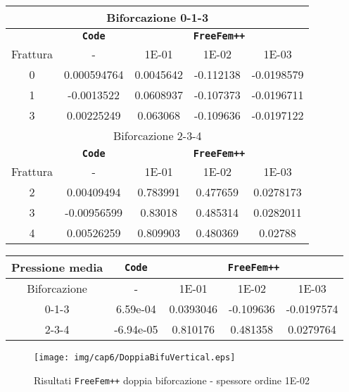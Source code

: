 \begin{center}
\begin{tabular}{|c|c|c|c|c|}
\hline
\multicolumn{5}{|c|}{Biforcazione 0-1-3}\\
\hline
 & \textbf{\texttt{Code}} & \multicolumn{3}{|c|}{\textbf{\texttt{FreeFem++}}} \\
\hline
\multicolumn{1}{|c|}{Frattura} & - &
\multicolumn{1}{|c|}{1E-01} & 1E-02 & 1E-03 \\
\hline
 0 & 0.000594764 & 0.0045642 & -0.112138 & -0.0198579\\
 1 & -0.0013522 & 0.0608937 & -0.107373 & -0.0196711\\  
 3 & 0.00225249 & 0.063068 & -0.109636 & -0.0197122\\
\hline
\multicolumn{5}{|c|}{Biforcazione 2-3-4}\\
\hline
 & \textbf{\texttt{Code}} & \multicolumn{3}{|c|}{\textbf{\texttt{FreeFem++}}} \\
\hline
\multicolumn{1}{|c|}{Frattura} & - &
\multicolumn{1}{|c|}{1E-01} & 1E-02 & 1E-03 \\
\hline
 2 & 0.00409494 & 0.783991 & 0.477659 & 0.0278173\\ 
 3 & -0.00956599 & 0.83018 & 0.485314 & 0.0282011\\
 4 & 0.00526259 & 0.809903 & 0.480369 & 0.02788\\
\hline
\end{tabular}
\end{center}

\begin{center}
\begin{tabular}{|c|c|c|c|c|}
\hline
 Pressione media & \textbf{\texttt{Code}} & \multicolumn{3}{|c|}{\textbf{\texttt{FreeFem++}}} \\ 
\hline
\multicolumn{1}{|c|}{Biforcazione} & - &
\multicolumn{1}{|c|}{1E-01} & 1E-02 & 1E-03 \\
\hline
  0-1-3 & 6.59e-04 & 0.0393046 & -0.109636 & -0.0197574 \\
  2-3-4 & -6.94e-05 & 0.810176 & 0.481358 & 0.0279764 \\
\hline
\end{tabular}
\end{center}

\begin{figure}[h!]
\centering
\texttt{[image: img/cap6/DoppiaBifuVertical.eps]}
\caption{Risultati \texttt{FreeFem++} doppia biforcazione - spessore ordine 1E-02 }\label{DoppiaBifuVertical1E-02}
\end{figure}

